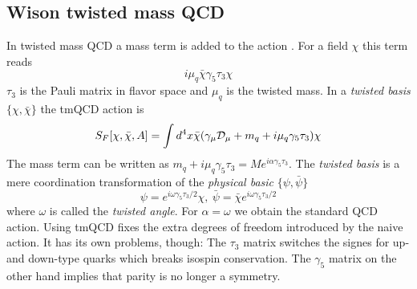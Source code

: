	\subsection{Wison twisted mass QCD}
	
	In twisted mass QCD a mass term is added to the action . For a field $\chi$ this term reads \cite{twisted_mass_qcd}
	\begin{equation}
	    i\mu_q\bar{\chi}\gamma_5\tau_3\chi
	\end{equation}
	$\tau_3$ is the Pauli matrix in flavor space and $\mu_q$ is the twisted mass. In a \textit{twisted basis} $\{\chi,\bar{\chi}\}$ the tmQCD action is
	\begin{equation}
	    S_F[\chi,\bar{\chi},A] = \int d^4x\bar{\chi}(\gamma_\mu \mathcal{D}_\mu + m_q + i\mu_q \gamma_5\tau_3)\chi
	\end{equation}
	The mass term can be written as $m_q + i\mu_q\gamma_5\tau_3 = Me^{i\alpha\gamma_5\tau_3}$. The \textit{twisted basis} is a mere coordination transformation of the \textit{physical basic} $\{\psi,\bar{\psi}\}$
	\begin{equation}
	    \psi = e^{i\omega\gamma_5\tau_3/2}\chi,\ \bar{\psi} = \bar{\chi}e^{i\omega\gamma_5\tau_3/2}
	\end{equation}
	where $\omega$ is called the \textit{twisted angle}. For $\alpha = \omega$ we obtain the standard QCD action. Using tmQCD fixes the extra degrees of freedom introduced by the naive action. It has its own problems, though: The $\tau_3$ matrix switches the signes for up- and down-type quarks which breaks isospin conservation. The $\gamma_5$ matrix on the other hand implies that parity is no longer a symmetry.
	
